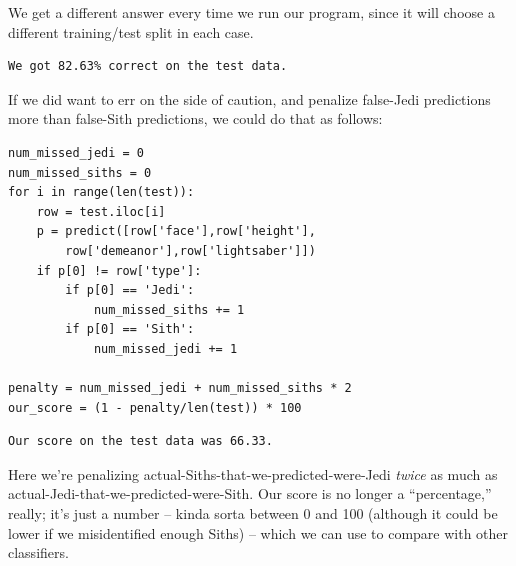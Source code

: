 We get a different answer every time we run our program, since it will choose
a different training/test split in each case.

\begin{Verbatim}[fontsize=\small,samepage=true,frame=leftline,framesep=5mm,framerule=1mm]
We got 82.63% correct on the test data.
\end{Verbatim}

If we did want to err on the side of caution, and penalize false-Jedi
predictions more than false-Sith predictions, we could do that as follows: 

\begin{Verbatim}[fontsize=\small,samepage=true,frame=single,framesep=3mm]
num_missed_jedi = 0
num_missed_siths = 0
for i in range(len(test)):
    row = test.iloc[i]
    p = predict([row['face'],row['height'],
        row['demeanor'],row['lightsaber']])
    if p[0] != row['type']:
        if p[0] == 'Jedi':
            num_missed_siths += 1
        if p[0] == 'Sith':
            num_missed_jedi += 1

penalty = num_missed_jedi + num_missed_siths * 2
our_score = (1 - penalty/len(test)) * 100
\end{Verbatim}
\vspace{-.2in}

\begin{Verbatim}[fontsize=\small,samepage=true,frame=leftline,framesep=5mm,framerule=1mm]
Our score on the test data was 66.33.
\end{Verbatim}

Here we're penalizing actual-Siths-that-we-predicted-were-Jedi \textit{twice}
as much as actual-Jedi-that-we-predicted-were-Sith. Our score is no longer a
``percentage,'' really; it's just a number -- kinda sorta between 0 and 100
(although it could be lower if we misidentified enough Siths) -- which we can
use to compare with other classifiers.
